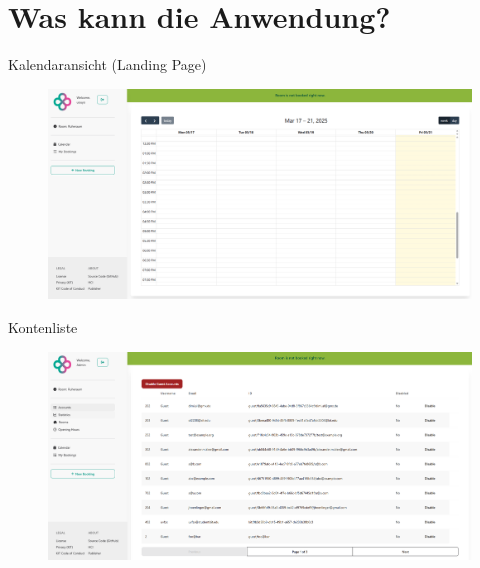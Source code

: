\section{Was kann die Anwendung?}
\begin{frame}{Kalendaransicht (Landing Page)}
    \thispagestyle{plain}
    \begin{figure}
        \centering
        \includegraphics[width=1\linewidth]{pictures/calendar.png}
        \label{fig:enter-label}
    \end{figure}
    
\end{frame}

\begin{frame}{Kontenliste}
    \thispagestyle{plain}
    \begin{figure}
        \centering
        \includegraphics[width=1\linewidth]{pictures/admin_users.png}
        \label{fig:enter-label}
    \end{figure}
    
\end{frame}

